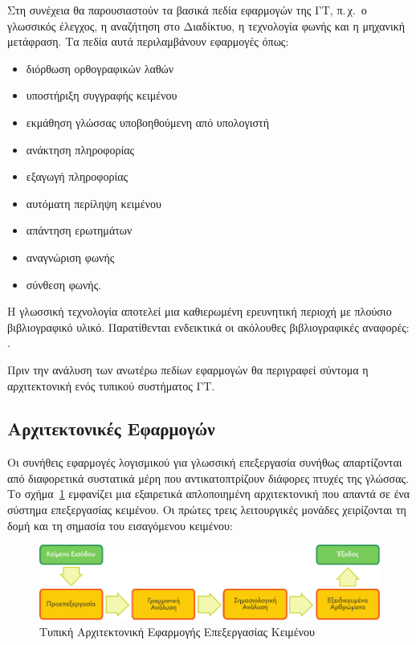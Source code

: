 \documentclass[]{../../metanetpaper}
\begin{document}
\begin{multicols}{2}
Στη συνέχεια θα παρουσιαστούν τα βασικά πεδία εφαρμογών της ΓΤ, π.\,χ.~ο γλωσσικός έλεγχος, η αναζήτηση στο Διαδίκτυο, η τεχνολογία φωνής και η μηχανική μετάφραση. Τα πεδία αυτά περιλαμβάνουν εφαρμογές όπως:

\begin{itemize}
\item διόρθωση ορθογραφικών λαθών
\item υποστήριξη συγγραφής κειμένου
\item εκμάθηση γλώσσας υποβοηθούμενη από υπολογιστή
\item ανάκτηση πληροφορίας
\item εξαγωγή πληροφορίας
\item αυτόματη περίληψη κειμένου
\item απάντηση ερωτημάτων
\item αναγνώριση φωνής 
\item σύνθεση φωνής.
\end{itemize}

Η γλωσσική τεχνολογία αποτελεί μια καθιερωμένη ερευνητική περιοχή με πλούσιο βιβλιογραφικό υλικό. Παρατίθενται ενδεικτικά οι ακόλουθες βιβλιογραφικές αναφορές: \cite{jurafsky-martin01,manning-schuetze1,lt-world1,lt-survey1}.

Πριν την ανάλυση των ανωτέρω πεδίων εφαρμογών θα περιγραφεί σύντομα η αρχιτεκτονική ενός τυπικού συστήματος ΓΤ. 

\subsection{Αρχιτεκτονικές Εφαρμογών}

Οι συνήθεις εφαρμογές λογισμικού για γλωσσική επεξεργασία συνήθως απαρτίζονται από διαφορετικά συστατικά μέρη που αντικατοπτρίζουν διάφορες πτυχές της γλώσσας. Το σχήμα~\ref{fig:textprocessingarch_de} εμφανίζει μια εξαιρετικά απλοποιημένη αρχιτεκτονική που απαντά σε ένα σύστημα επεξεργασίας κειμένου. Οι πρώτες τρεις λειτουργικές μονάδες χειρίζονται τη δομή και τη σημασία του εισαγόμενου κειμένου:

\begin{figure}[b]
  \center
  \includegraphics[width=\textwidth]{../_media/greek/text_processing_app_architecture}
  \caption{Τυπική Αρχιτεκτονική Εφαρμογής Επεξεργασίας Κειμένου}
  \label{fig:textprocessingarch_de}
\end{figure}


\end{multicols}
\end{document}
